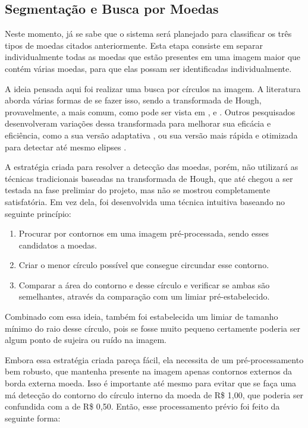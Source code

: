 \documentclass[10pt,journal,compsoc]{IEEEtran}
\begin{document}
\subsection{Segmentação e Busca por Moedas}
\label{sec:segmentacao}

Neste momento, já se sabe que o sistema será planejado para classificar os três tipos de moedas citados anteriormente. Esta etapa consiste em separar individualmente todas as moedas que estão presentes em uma imagem maior que contém várias moedas, para que elas possam ser identificadas individualmente.

A ideia pensada aqui foi realizar uma busca por círculos na imagem. A literatura aborda várias formas de se fazer isso, sendo a transformada de Hough, provavelmente, a mais comum, como pode ser vista em \cite{ioannou1999circle}, \cite{kerbyson1995circle} e \cite{yuen1990comparative}. Outros pesquisados desenvolveram variações dessa transformada para melhorar sua eficácia e eficiência, como a sua versão adaptativa \cite{illingworth1987adaptive}, ou sua versão mais rápida e otimizada para detectar até mesmo elipses \cite{guil1997lower}.

A estratégia criada para resolver a detecção das moedas, porém, não utilizará as técnicas tradicionais baseadas na transformada de Hough, que até chegou a ser testada na fase prelimiar do projeto, mas não se mostrou completamente satisfatória. Em vez dela, foi desenvolvida uma técnica intuitiva baseando no seguinte princípio:

\begin{enumerate}
\item Procurar por contornos em uma imagem pré-processada, sendo esses candidatos a moedas.
\item Criar o menor círculo possível que consegue circundar esse contorno.
\item Comparar a área do contorno e desse círculo e verificar se ambas são semelhantes, através da comparação com um limiar pré-estabelecido.
\end{enumerate}

Combinado com essa ideia, também foi estabelecida um limiar de tamanho mínimo do raio desse círculo, pois se fosse muito pequeno certamente poderia ser algum ponto de sujeira ou ruído na imagem.

Embora essa estratégia criada pareça fácil, ela necessita de um pré-processamento bem robusto, que mantenha presente na imagem apenas contornos externos da borda externa moeda. Isso é importante até mesmo para evitar que se faça uma má detecção do contorno do círculo interno da moeda de R\$ 1,00, que poderia ser confundida com a de R\$ 0,50. Então, esse processamento prévio foi feito da seguinte forma:
\end{document}
